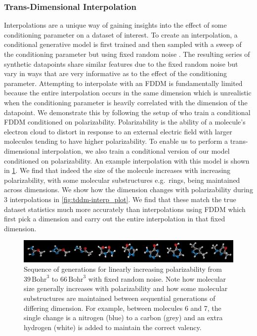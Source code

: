 \subsubsection{Trans-Dimensional Interpolation}
\label{sec:mol_interp}
Interpolations are a unique way of gaining insights into the effect of some conditioning parameter on a dataset of interest.
To create an interpolation, a conditional generative model is first trained and then sampled with a sweep of the conditioning parameter but using fixed random noise \cite{hoogeboom2022equivariant}.
The resulting series of synthetic datapoints share similar features due to the fixed random noise but vary in ways that are very informative as to the effect of the conditioning parameter. 
Attempting to interpolate with an FDDM is fundamentally limited because the entire interpolation occurs in the same dimension which is unrealistic when the conditioning parameter is heavily correlated with the dimension of the datapoint. We demonstrate this by following the setup of \cite{hoogeboom2022equivariant} who train a conditional FDDM conditioned on polarizability.
Polarizability is the ability of a molecule's electron cloud to distort in response to an external electric field \cite{modernphysicalorganicchemistry} with larger molecules tending to have higher polarizability. To enable us to perform a trans-dimensional interpolation, we also train a conditional version of our model conditioned on polarizability. An example interpolation with this model is shown in \cref{fig:tddm-interp}. We find that indeed the size of the molecule increases with increasing polarizability, with some molecular substructures e.g.~rings, being maintained across dimensions.
We show how the dimension changes with polarizability during 3 interpolations in \cref{fig:tddm-interp_plot}. We find that these match the true dataset statistics much more accurately than interpolations using FDDM which first pick a dimension and carry out the entire interpolation in that fixed dimension.

\begin{figure}[t]
    \centering
    \includegraphics[width=\textwidth]{figs/tddm/small_interp_bright.pdf}
    \caption{Sequence of generations for linearly increasing polarizability from $39 \, \text{Bohr}^3$ to $66 \, \text{Bohr}^3$ with fixed random noise. Note how molecular size generally increases with polarizability and how some molecular substructures are maintained between sequential generations of differing dimension. For example, between molecules 6 and 7, the single change is a nitrogen (blue) to a carbon (grey) and an extra hydrogen (white) is added to maintain the correct valency.}
    \label{fig:tddm-interp}
\end{figure}



